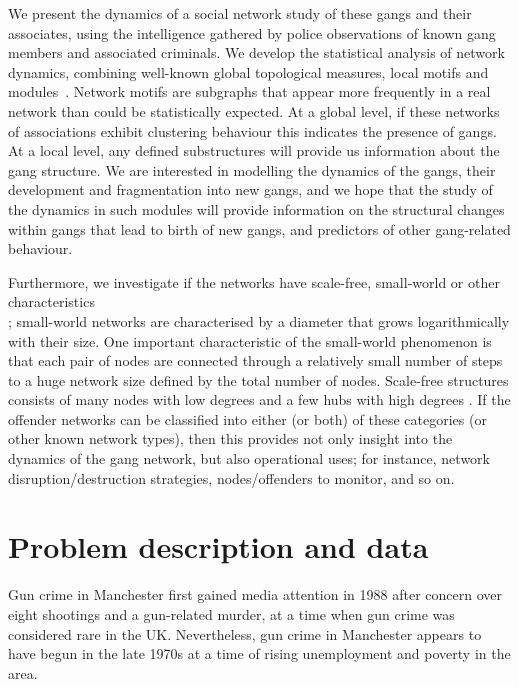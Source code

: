 \documentclass[twocolumn]{svjour3}          %
\theoremstyle{definition}
\begin{document}
We present the dynamics of a social network study of these gangs and
their associates, using the intelligence gathered by police
observations of known gang members and associated criminals. We
develop the statistical analysis of network dynamics, combining
well-known global topological measures, local motifs and
modules~\citep{CostaRodriguesTraviesoVillasBoas2007,Jackson2010,Newman2003}.
Network motifs are subgraphs that appear more frequently in a real
network than could be statistically expected. At a global level, if
these networks of associations exhibit clustering behaviour this
indicates the presence of gangs. At a local level, any defined
substructures will provide us information about the gang structure. We
are interested in modelling the dynamics of the gangs, their
development and fragmentation into new gangs, and we hope that the
study of the dynamics in such modules will provide information on the
structural changes within gangs that lead to birth of new gangs, and
predictors of other gang-related behaviour.

Furthermore, we investigate if the networks have scale-free,
small-world or other characteristics\\
\citep{Watts1999,AlbertBarabasi2002,Newman2003}; small-world networks
are characterised by a diameter that grows logarithmically with their
size. One important characteristic of the small-world phenomenon is
that each pair of nodes are connected through a relatively small
number of steps to a huge network size defined by the total number of
nodes. Scale-free structures consists of many nodes with low degrees
and a few hubs with high degrees
\citep{AlbAlbNak04,CostaRodriguesTraviesoVillasBoas2007,Jackson2010}. If
the offender networks can be classified into either (or both) of these
categories (or other known network types), then this provides not only
insight into the dynamics of the gang network, but also operational
uses; for instance, network disruption/destruction strategies,
nodes/offenders to monitor, and so on.


\section{Problem description and data}\label{sec:problemdescription}

Gun crime in Manchester first gained media attention in 1988 after
concern over eight shootings and a gun-related murder, at a time when
gun crime was considered rare in the UK. Nevertheless, gun crime in
Manchester appears to have begun in the late 1970s at a time of rising
unemployment and poverty in the area.
\end{document}
